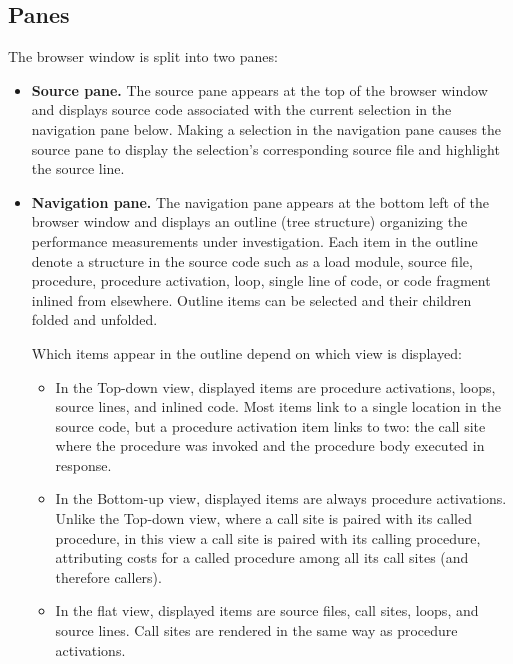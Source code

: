 \documentclass[english]{article}
\begin{document}
\subsection{Panes}

The browser window is split into two panes:

\begin{itemize}

\item \textbf{Source pane.} The source pane appears at the top of the browser window
and displays source code associated with the current selection in the navigation pane below.
Making a selection in the navigation pane causes the source pane
to display the selection's corresponding source file and highlight the source line.

\item \textbf{Navigation pane.}
The navigation pane appears at the bottom left of the browser window
and displays an outline (tree structure) organizing the performance measurements under investigation.
Each item in the outline denote a structure in the source code such as a
load module, source file, procedure, procedure activation,
loop, single line of code, or code fragment inlined from elsewhere.
Outline items can be selected and their children folded and unfolded.

Which items appear in the outline depend on which view is displayed:

\begin{itemize}

\item In the Top-down view, displayed items are
procedure activations, loops, source lines, and inlined code.
Most items link to a single location in the source code,
but a procedure activation item links to two:
the call site where the procedure was invoked and the procedure body executed in response.

\item In the Bottom-up view, displayed items are always procedure activations.
Unlike the Top-down view, where a call site is paired with its called procedure,
in this view a call site is paired with its calling procedure,
attributing costs for a called procedure among all its call sites (and therefore callers).

\item In the flat view, displayed items are
source files, call sites, loops, and source lines.
Call sites are rendered in the same way as procedure activations.

\end{itemize}


\end{itemize}
\end{document}
